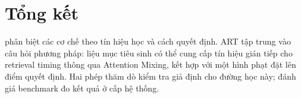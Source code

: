 \section{Tổng kết}
 phân biệt các cơ chế theo tín hiệu học và cách quyết định. ART tập trung vào câu hỏi phương pháp: liệu mục tiêu sinh có thể cung cấp tín hiệu gián tiếp cho retrieval timing thông qua Attention Mixing, kết hợp với một hình phạt đặt lên điểm quyết định. Hai phép thăm dò kiểm tra giả định cho đường học này; đánh giá benchmark đo kết quả ở cấp hệ thống.
